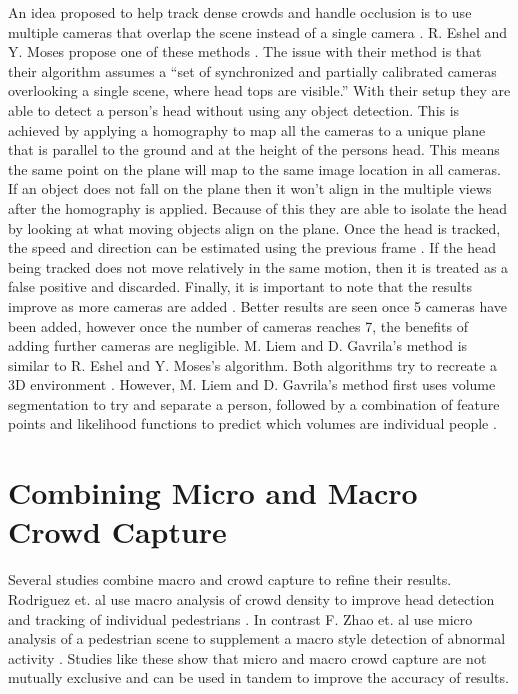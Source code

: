 \documentclass[12pt, onecolumn, conference]{IEEEtran}
\begin{document}
An idea proposed to help track dense crowds and handle occlusion is to use multiple cameras that overlap the scene instead of a single camera \cite{R. Eshel}\cite{M. Liem}. R. Eshel and Y. Moses propose one of these methods \cite{R. Eshel}. The issue with their method is that their algorithm assumes a “set of synchronized and partially calibrated cameras overlooking a single scene, where head tops are visible.” With their setup they are able to detect a person’s head without using any object detection. This is achieved by applying a homography to map all the cameras to a unique plane that is parallel to the ground and at the height of the persons head. This means the same point on the plane will map to the same image location in all cameras. If an object does not fall on the plane then it won’t align in the multiple views after the homography is applied. Because of this they are able to isolate the head by looking at what moving objects align on the plane.
Once the head is tracked, the speed and direction can be estimated using the previous frame \cite{R. Eshel}. If the head being tracked does not move relatively in the same motion, then it is treated as a false positive and discarded. 
Finally, it is important to note that the results improve as more cameras are added \cite{R. Eshel}. Better results are seen once 5 cameras have been added, however once the number of cameras reaches 7, the benefits of adding further cameras are negligible.
M. Liem and D. Gavrila’s method is similar to R. Eshel and Y. Moses’s algorithm. Both algorithms try to recreate a 3D environment \cite{R. Eshel}\cite{M. Liem}. However, M. Liem and D. Gavrila’s method first uses volume segmentation to try and separate a person, followed by a combination of feature points and likelihood functions to predict which volumes are individual people \cite{M. Liem}.


\section{Combining Micro and Macro Crowd Capture}

Several studies combine macro and crowd capture to refine their results. Rodriguez et. al use macro analysis of crowd density to improve head detection and tracking of individual pedestrians \cite{M. Rodriguez}. In contrast F. Zhao et. al use micro analysis of a pedestrian scene to supplement a macro style detection of abnormal activity \cite{D. Zhang}. Studies like these show that micro and macro crowd capture are not mutually exclusive and can be used in tandem to improve the accuracy of results. 
\end{document}
